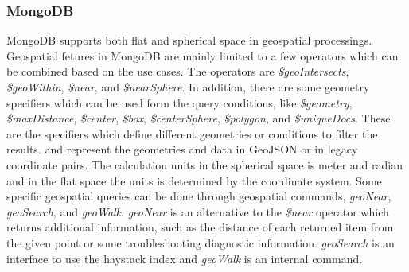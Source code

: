 \documentclass[a4paper,12pt]{article}
\begin{document}
\subsubsection{MongoDB}
\label{mongo}
\cite{mongogeneral2010}
\cite{mongoinaction2011}
MongoDB supports both flat and spherical space in geospatial processings. 
Geospatial fetures in MongoDB are mainly limited to a few operators which can be combined based on the use cases. 
The operators are \textit{\$geoIntersects}, \textit{\$geoWithin}, \textit{\$near}, and \textit{\$nearSphere}. 
In addition, there are some geometry specifiers which can be used form the query conditions, like 
\textit{\$geometry}, \textit{\$maxDistance}, \textit{\$center}, \textit{\$box}, \textit{\$centerSphere}, \textit{\$polygon}, and \textit{\$uniqueDocs}.
These are the specifiers which define different geometries or conditions to filter the results. 
and represent the geometries and data in GeoJSON or in legacy coordinate pairs. 
The calculation units in the spherical space is meter and radian and in the flat space the units is determined by the coordinate system. 
Some specific geospatial queries can be done through geospatial commands, 
\textit{geoNear}, \textit{geoSearch}, and \textit{geoWalk}. 
\textit{geoNear} is an alternative to the \textit{\$near} operator which returns additional information, 
such as the distance of each returned item from the given point or some troubleshooting diagnostic information. 
\textit{geoSearch} is an interface to use the haystack index and \textit{geoWalk} is an internal command.
\end{document}

